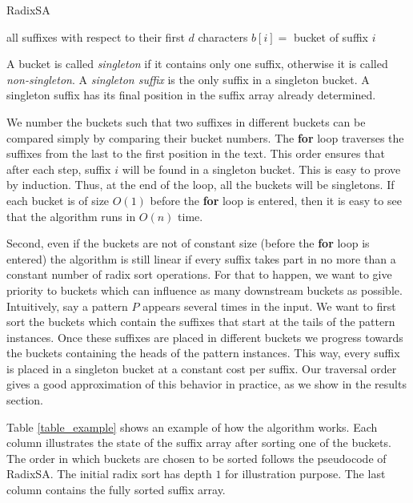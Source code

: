 {\LinesNumbered
\begin{algorithm}[H]
\caption{RadixSA} 
\RadixSort all suffixes with respect to their first $d$ characters\;
\Let $b[i]=$ bucket of suffix $i$ \;
\end{algorithm}
}

A bucket is called {\em singleton} if it contains only one suffix, otherwise
it is called {\em non-singleton}. A
{\em singleton suffix} is the only suffix in a singleton bucket. A
singleton suffix has its final position in the suffix array already determined.

We number the buckets such that two suffixes in different buckets can be compared
simply by comparing their bucket numbers. The {\bf for} loop traverses the suffixes 
from the last to the first position in the text. This order ensures that
after each step, suffix $i$ will be found in a singleton bucket. This is easy
to prove by induction. Thus, at the end of the loop, all
the buckets will be singletons. If each bucket is of size $O(1)$ before the
{\bf for} loop is entered, then it is easy to see that the algorithm runs in
$O(n)$ time. 

Second, even if the buckets are not of constant size (before the
{\bf for} loop is entered) the algorithm is still linear if every suffix takes
part in no more than a constant number of radix sort operations. For that to happen, 
we want to give priority to buckets which can influence as many downstream buckets 
as possible. Intuitively, say a pattern $P$
appears several times in the input. We want to first sort the buckets which contain the
suffixes that start at the tails of the pattern instances. Once these suffixes are 
placed in different buckets we progress towards the buckets containing the heads of
the pattern instances. This way, every suffix is placed in a singleton bucket at a constant
cost per suffix. Our traversal order gives a good approximation of this behavior in 
practice, as we show in the results section.

Table \ref{table_example} shows an example of how the algorithm works. Each
column illustrates the state of the suffix array after sorting one of the
buckets. The order in which buckets are chosen to be sorted follows the pseudocode of RadixSA.
The initial radix sort has depth $1$ for illustration purpose. The last column
contains the fully sorted suffix array.


